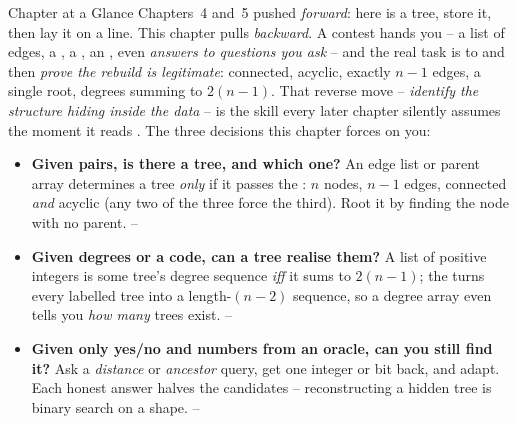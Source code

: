 
\begin{chaptertheorybox}{Chapter at a Glance}
Chapters~4 and~5 pushed \emph{forward}: here is a tree, store it, then lay it on a line.
This chapter pulls \emph{backward}. A contest hands you  -- a list of edges, a
, a , an , even \emph{answers to
questions you ask} -- and the real task is to  and then \emph{prove the
rebuild is legitimate}: connected, acyclic, exactly $n-1$ edges, a single root, degrees summing
to $2(n-1)$. That reverse move -- \emph{identify the structure hiding inside the data} -- is the
skill every later chapter silently assumes the moment it reads . The three
decisions this chapter forces on you:
\begin{itemize}[nosep]
  \item \textbf{Given pairs, is there a tree, and which one?} An edge list or parent array
        determines a tree \emph{only} if it passes the : $n$ nodes,
        $n-1$ edges, connected \emph{and} acyclic (any two of the three force the third). Root
        it by finding the node with no parent. \hfill {}--
  \item \textbf{Given degrees or a code, can a tree realise them?} A list of positive integers
        is some tree's degree sequence \emph{iff} it sums to $2(n-1)$; the 
        turns every labelled tree into a length-$(n-2)$ sequence, so a degree array even tells
        you \emph{how many} trees exist. \hfill {}--
  \item \textbf{Given only yes/no and numbers from an oracle, can you still find it?} Ask a
        \emph{distance} or \emph{ancestor} query, get one integer or bit back, and adapt. Each
        honest answer halves the candidates -- reconstructing a hidden tree is binary search on
        a shape. \hfill {}--
\end{itemize}


\end{chaptertheorybox}
